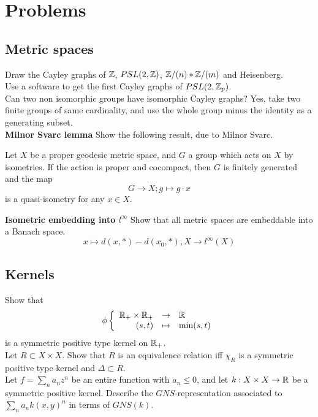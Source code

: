 \newpage
\section{Problems}

\subsection{Metric spaces}
Draw the Cayley graphs of $\mathbb Z$, $PSL(2,\mathbb Z)$, $\mathbb Z / (n) \ast \mathbb Z / (m)$ and Heisenberg.\\

Use a software to get the first Cayley graphs of $PSL(2,\mathbb Z_p)$.\\

Can two non isomorphic groups have isomorphic Cayley graphs? Yes, take two finite groups of same cardinality, and use the whole group minus the identity as a generating subset.\\

\textbf{Milnor Svarc lemma} Show the following result, due to Milnor Svarc.  
\begin{thm}
Let $X$ be a proper geodesic metric space, and $G$ a group which acts on $X$ by isometries. If the action is proper and cocompact, then $G$ is finitely generated and the map
\[G \rightarrow X ; g\mapsto g\cdot x\]
is a quasi-isometry for any $x\in X$.
\end{thm}

\textbf{Isometric embedding into $l^\infty$} Show that all metric spaces are embeddable into a Banach space. 
\[x\mapsto d(x, *)-d(x_0, *), X\rightarrow l^\infty (X)\]

\subsection{Kernels}

Show that \[\phi \left\{\begin{array}{rcl} \mathbb R_+ \times \mathbb R_+ & \rightarrow & \mathbb R \\ (s,t) & \mapsto & \min(s,t)\end{array}\right.\]
is a symmetric positive type kernel on $\mathbb R_+$.\\

Let $R\subset X\times X$. Show that $R$ is an equivalence relation iff $\chi_R$ is a symmetric positive type kernel and $\Delta\subset R$.\\
 
Let $f=\sum_n a_n z^n$ be an entire function with $a_n\leq 0$, and let $k: X\times X\rightarrow \mathbb R$ be a symmetric positive kernel. Describe the $GNS$-representation associated to $\sum_n a_n k(x,y)^n$ in terms of $GNS(k)$.\\

